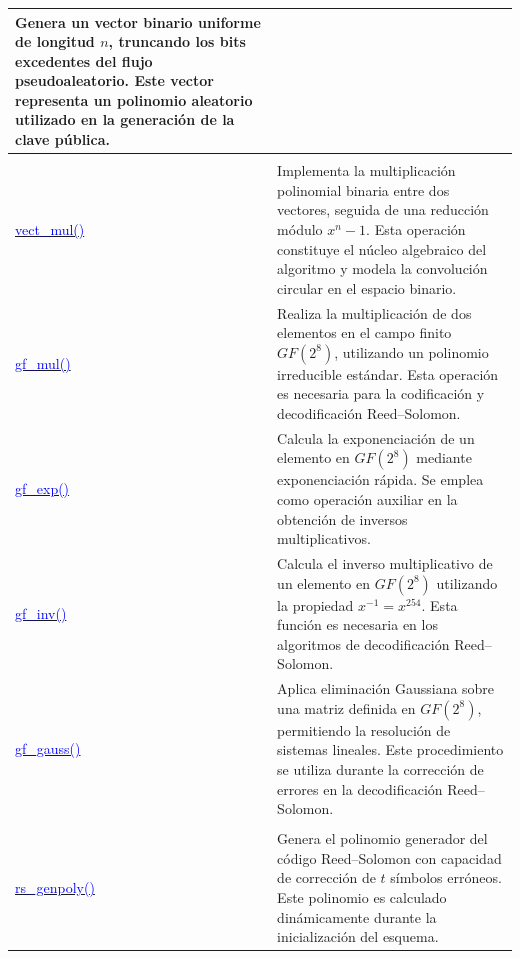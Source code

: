 \begin{longtable}{|>{\centering\arraybackslash}m{4.7cm}|>{\arraybackslash}m{11.9cm}|}
Genera un vector binario uniforme de longitud $n$, truncando los bits excedentes del flujo pseudoaleatorio. Este vector representa un polinomio aleatorio utilizado en la generación de la clave pública.
 \\
\hline
\multicolumn{2}{|c|}{\textbf{Operaciones algebraicas}} \\
\hline
\href{https://github.com/camilo-home/hqc128/blob/30e4dd2663a1562349b38cff338aa3e4845d5bf5/hqc128.py#L89}{\textcolor{blue}{vect\_mul()}} &
Implementa la multiplicación polinomial binaria entre dos vectores, seguida de una reducción módulo $x^n-1$. Esta operación constituye el núcleo algebraico del algoritmo y modela la convolución circular en el espacio binario.
 \\
\hline
\href{https://github.com/camilo-home/hqc128/blob/30e4dd2663a1562349b38cff338aa3e4845d5bf5/hqc128.py#L97}{\textcolor{blue}{gf\_mul()}} &
Realiza la multiplicación de dos elementos en el campo finito $GF(2^8)$, utilizando un polinomio irreducible estándar. Esta operación es necesaria para la codificación y decodificación Reed–Solomon.
 \\
\hline
\href{https://github.com/camilo-home/hqc128/blob/30e4dd2663a1562349b38cff338aa3e4845d5bf5/hqc128.py#L104}{\textcolor{blue}{gf\_exp()}} &
Calcula la exponenciación de un elemento en $GF(2^8)$ mediante exponenciación rápida. Se emplea como operación auxiliar en la obtención de inversos multiplicativos.
 \\
\hline
\href{https://github.com/camilo-home/hqc128/blob/30e4dd2663a1562349b38cff338aa3e4845d5bf5/hqc128.py#L116}{\textcolor{blue}{gf\_inv()}} &
Calcula el inverso multiplicativo de un elemento en $GF(2^8)$ utilizando la propiedad $x^{-1}=x^{254}$. Esta función es necesaria en los algoritmos de decodificación Reed–Solomon.
 \\
\hline
\href{https://github.com/camilo-home/hqc128/blob/30e4dd2663a1562349b38cff338aa3e4845d5bf5/hqc128.py#L119}{\textcolor{blue}{gf\_gauss()}} &
Aplica eliminación Gaussiana sobre una matriz definida en $GF(2^8)$, permitiendo la resolución de sistemas lineales. Este procedimiento se utiliza durante la corrección de errores en la decodificación Reed–Solomon.
 \\
\hline
\multicolumn{2}{|c|}{\textbf{Codificadores de corrección de errores}} \\
\hline
\href{https://github.com/camilo-home/hqc128/blob/30e4dd2663a1562349b38cff338aa3e4845d5bf5/hqc128.py#L144}{\textcolor{blue}{rs\_genpoly()}} &
Genera el polinomio generador del código Reed–Solomon con capacidad de corrección de $t$ símbolos erróneos. Este polinomio es calculado dinámicamente durante la inicialización del esquema.

\end{longtable}
